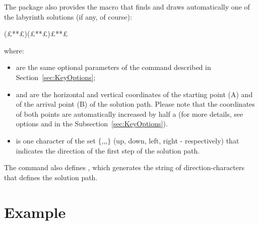 \documentclass[a4paper,11pt,headinclude,footinclude]{scrartcl}
\def\ins{~}
\begin{document}
The package also provides the macro  that finds and draws automatically one of the labyrinth solutions (if any, of course):
\begin{code}
(£**£)(£**£){£**£}
\end{code}
where:
\begin{itemize}
\item {} are the same optional parameters of the  command described in Section\ins\ref{sec:KeyOptions};

\item {} and  are the horizontal and vertical coordinates of the starting point (A) and of the arrival point (B) of the  solution path. Please note that the coordinates of both points are automatically increased by half a  (for more details, see options  and  in the Subsection\ins\ref{sec:KeyOptions}).

\item {} is one character of the set $\{$,,,$\}$ (up, down, left, right - respectively) that indicates the direction of the first step of the solution path.

\end{itemize}

The  command also defines , which generates the string of direction-characters that defines the solution path.

\clearpage
\section{Example}
\end{document}
